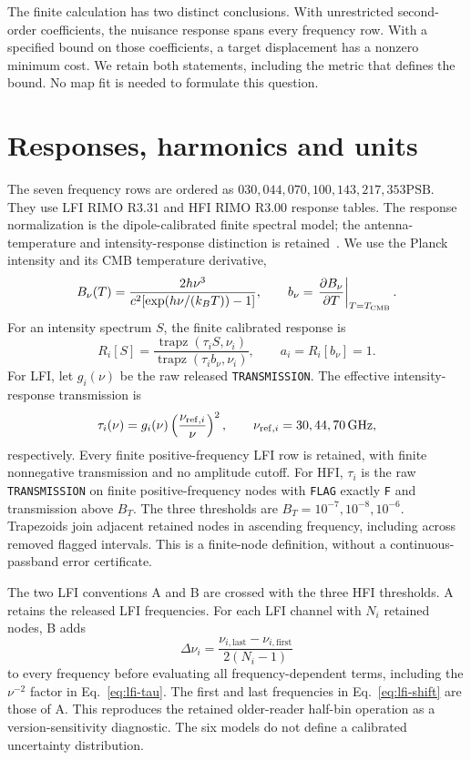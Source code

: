 \documentclass[aps,prd,onecolumn,11pt,nofootinbib,notitlepage]{revtex4-2}
\begin{document}
The finite calculation has two distinct conclusions. With unrestricted second-order coefficients, the nuisance response spans every frequency row. With a specified bound on those coefficients, a target displacement has a nonzero minimum cost. We retain both statements, including the metric that defines the bound. No map fit is needed to formulate this question.

\section{Responses, harmonics and units}

The seven frequency rows are ordered as $030,044,070,100,143,217,353\mathrm{PSB}$. They use LFI RIMO R3.31 and HFI RIMO R3.00 response tables. The response normalization is the dipole-calibrated finite spectral model; the antenna-temperature and intensity-response distinction is retained~\cite{PlanckLFI2013}. We use the Planck intensity and its CMB temperature derivative,
\begin{equation}
 B_\nu(T)=\frac{2h\nu^3}{c^2[\exp(h\nu/(k_BT))-1]},\qquad
 b_\nu=\left.\frac{\partial B_\nu}{\partial T}\right|_{T=T_{\rm CMB}}.
 \label{eq:planck}
\end{equation}
For an intensity spectrum $S$, the finite calibrated response is
\begin{equation}
 R_i[S]=\frac{\operatorname{trapz}(\tau_i S,\nu_i)}{\operatorname{trapz}(\tau_i b_\nu,\nu_i)},\qquad
 a_i=R_i[b_\nu]=1.
 \label{eq:response}
\end{equation}
For LFI, let $g_i(\nu)$ be the raw released \texttt{TRANSMISSION}. The effective intensity-response transmission is
\begin{equation}
 \tau_i(\nu)=g_i(\nu)\left(\frac{\nu_{{\rm ref},i}}{\nu}\right)^2,
 \qquad \nu_{{\rm ref},i}=30,44,70\,\mathrm{GHz},
 \label{eq:lfi-tau}
\end{equation}
respectively. Every finite positive-frequency LFI row is retained, with finite nonnegative transmission and no amplitude cutoff. For HFI, $\tau_i$ is the raw \texttt{TRANSMISSION} on finite positive-frequency nodes with \texttt{FLAG} exactly \texttt{F} and transmission above $B_T$. The three thresholds are $B_T=10^{-7},10^{-8},10^{-6}$. Trapezoids join adjacent retained nodes in ascending frequency, including across removed flagged intervals. This is a finite-node definition, without a continuous-passband error certificate.

The two LFI conventions A and B are crossed with the three HFI thresholds. A retains the released LFI frequencies. For each LFI channel with $N_i$ retained nodes, B adds
\begin{equation}
 \Delta\nu_i=\frac{\nu_{i,\mathrm{last}}-\nu_{i,\mathrm{first}}}{2(N_i-1)}
 \label{eq:lfi-shift}
\end{equation}
to every frequency before evaluating all frequency-dependent terms, including the $\nu^{-2}$ factor in Eq.~\eqref{eq:lfi-tau}. The first and last frequencies in Eq.~\eqref{eq:lfi-shift} are those of A. This reproduces the retained older-reader half-bin operation as a version-sensitivity diagnostic. The six models do not define a calibrated uncertainty distribution.
\end{document}
